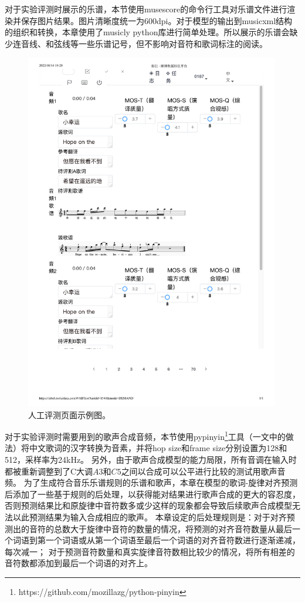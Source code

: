 对于实验评测时展示的乐谱，本节使用musescore的命令行工具对乐谱文件进行渲染并保存图片结果。图片清晰度统一为600dpi。对于模型的输出到musicxml结构的组织和转换，本章使用了musicly python库进行简单处理。所以展示的乐谱会缺少连音线、和弦线等一些乐谱记号，但不影响对音符和歌词标注的阅读。
\begin{figure}[!ht]
  \includegraphics[width=0.99\textwidth]{figure/ast/MOS_eval_page.pdf}
  \caption{人工评测页面示例图。}
\end{figure}
对于实验评测时需要用到的歌声合成音频，本节使用pypinyin\footnote{https://github.com/mozillazg/python-pinyin}工具（\citet{ren2020deepsinger}一文中的做法）将中文歌词的汉字转换为音素，并将hop size和frame size分别设置为128和512，采样率为24kHz。
另外，由于歌声合成模型的能力局限，所有音调在输入时都被重新调整到了C大调$A3$和$C5$之间以合成可以公平进行比较的测试用歌声音频。
为了生成符合音乐乐谱规则的乐谱和歌声，本章在模型的歌词-旋律对齐预测后添加了一些基于规则的后处理，以获得能对结果进行歌声合成的更大的容忍度，否则预测结果比和原旋律中音符数多或少这样的现象都会导致后续歌声合成模型无法以此预测结果为输入合成相应的歌声。
本章设定的后处理规则是：对于对齐预测出的音符的总数大于旋律中音符的数量的情况，将预测的对齐音符数量从最后一个词语到第一个词语或从第一个词语至最后一个词语的对齐音符数进行逐渐递减，每次减一；
对于预测音符数量和真实旋律音符数相比较少的情况，将所有相差的音符数都添加到最后一个词语的对齐上。
